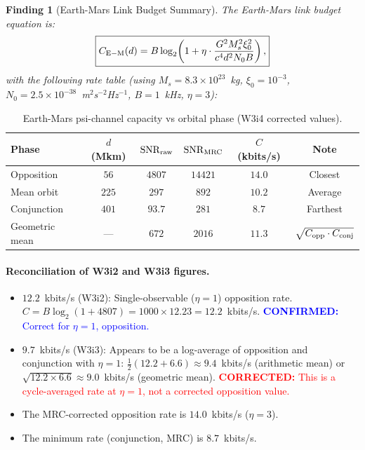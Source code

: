 \documentclass[aps,prd,twocolumn,superscriptaddress,nofootinbib]{revtex4-2}
\newcommand{\SNR}{\mathrm{SNR}}
\newcommand{\confirmed}[1]{\textcolor{blue}{\textbf{CONFIRMED:} #1}}
\newcommand{\corrected}[1]{\textcolor{red}{\textbf{CORRECTED:} #1}}
\newtheorem{finding}{Finding}
\begin{document}
\begin{finding}[Earth-Mars Link Budget Summary]
\label{find:link-budget}
The Earth-Mars link budget equation is:
\begin{equation}
\boxed{
C_{\rm E-M}(d) = B\log_2\!\left(1 + \eta \cdot
\frac{G^2 M_s^2 \xi_0^2}{c^4 d^2 N_0 B}\right),
}
\label{eq:link-budget}
\end{equation}
with the following rate table (using $M_s = 8.3\times10^{23}$~kg,
$\xi_0 = 10^{-3}$, $N_0 = 2.5\times10^{-38}$~m$^2$s$^{-2}$Hz$^{-1}$,
$B = 1$~kHz, $\eta = 3$):
\end{finding}

\begin{table}[h]
\centering
\caption{Earth-Mars psi-channel capacity vs orbital phase (W3i4 corrected values).}
\begin{tabular}{lccccc}
\hline\hline
Phase & $d$ (Mkm) & $\SNR_{\rm raw}$ & $\SNR_{\rm MRC}$ & $C$ (kbits/s) & Note \\
\hline
Opposition & $56$ & $4807$ & $14421$ & $14.0$ & Closest \\
Mean orbit & $225$ & $297$ & $892$ & $10.2$ & Average \\
Conjunction & $401$ & $93.7$ & $281$ & $8.7$ & Farthest \\
\hline
Geometric mean & --- & $672$ & $2016$ & $11.3$ & $\sqrt{C_{\rm opp}\cdot C_{\rm conj}}$ \\
\hline\hline
\end{tabular}
\label{tab:earth-mars-W3i4}
\end{table}

\paragraph{Reconciliation of W3i2 and W3i3 figures.}
\begin{itemize}
\item $12.2$~kbits/s (W3i2): Single-observable ($\eta = 1$) opposition rate.
  $C = B\log_2(1 + 4807) = 1000\times 12.23 = 12.2$~kbits/s. \confirmed{Correct for $\eta=1$, opposition.}
\item $9.7$~kbits/s (W3i3): Appears to be a log-average of opposition and
  conjunction with $\eta=1$: $\frac{1}{2}(12.2 + 6.6) \approx 9.4$~kbits/s
  (arithmetic mean) or $\sqrt{12.2 \times 6.6} \approx 9.0$~kbits/s
  (geometric mean). \corrected{This is a cycle-averaged rate at $\eta=1$,
  not a corrected opposition value.}
\item The MRC-corrected opposition rate is $14.0$~kbits/s ($\eta=3$).
\item The minimum rate (conjunction, MRC) is $8.7$~kbits/s.
\end{itemize}
\end{document}
